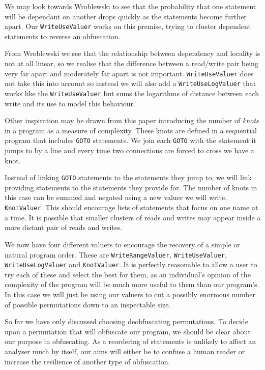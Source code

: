 \documentclass[twoside,a4paper]{report}
\begin{document}
We may look towards Wroblewski \cite{localityprob} to see that the probability that one statement will be dependant on another drops quickly as the
statements become further apart. Our \texttt{WriteUseValuer} works on this premise, trying to cluster dependent statements to reverse an obfuscation.

From Wroblewski we see that the relationship between dependency and locality is not at all linear, so we realise that the difference between a read/write
pair being very far apart and moderately far apart is not important. \texttt{WriteUseValuer} does not take this into account so instead we will also add
a \texttt{WriteUseLogValuer} that works like the \texttt{WriteUseValuer} but sums the logarithms of distance between each write and its use to model this
behaviour.

Other inspiration may be drawn from this paper \cite{knots} introducing the number of \textit{knots} in a program as a measure of complexity. These knots
are defined in a sequential program that includes \texttt{GOTO} statements. We join each \texttt{GOTO} with the statement it jumps to by a line and every
time two connections are forced to cross we have a knot.

Instead of linking \texttt{GOTO} statements to the statements they jump to, we will link providing statements to the statements they provide for. The number
of knots in this case can be summed and negated using a new valuer we will write, \texttt{KnotValuer}. This should encourage lists of statements that focus
on one name at a time. It is possible that smaller clusters of reads and writes may appear inside a more distant pair of reads and writes.

We now have four different valuers to encourage the recovery of a simple or natural program order. These are \texttt{WriteRangeValuer}, \texttt{WriteUseValuer},
\texttt{WriteUseLogValuer} and \texttt{KnotValuer}. It is perfectly reasonable to allow a user to try each of these and select the best for them, as an individual's
opinion of the complexity of the program will be much more useful to them than our program's. In this case we will just be using our valuers to cut a possibly
enormous number of possible permutations down to an inspectable size.

So far we have only discussed choosing deobfuscating permutations. To decide upon a permutation that will obfuscate our program, we should be clear about our
purpose in obfuscating. As a reordering of statements is unlikely to affect an analyser much by itself, our aims will either be to confuse a human reader or
increase the resilience of another type of obfuscation.
\end{document}
